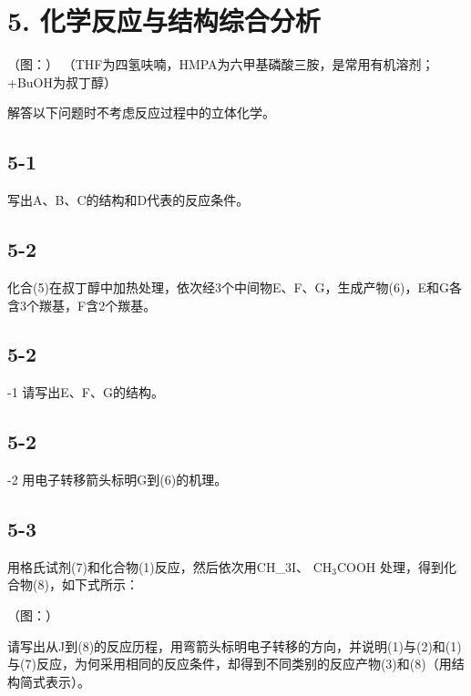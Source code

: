 \section*{5. 化学反应与结构综合分析}
（图：）
（THF为四氢呋喃，HMPA为六甲基磷酸三胺，是常⽤有机溶剂；+BuOH为叔丁醇）

解答以下问题时不考虑反应过程中的⽴体化学。

\subsection*{5-1}
写出A、B、C的结构和D代表的反应条件。

\subsection*{5-2}
化合(5)在叔丁醇中加热处理，依次经3个中间物E、F、G，⽣成产物(6)，E和G各含3个羰基，F含2个羰基。

\subsection*{5-2}
-1 请写出E、F、G的结构。

\subsection*{5-2}
-2 ⽤电⼦转移箭头标明G到(6)的机理。

\subsection*{5-3}
⽤格⽒试剂(7)和化合物(1)反应，然后依次⽤CH_{3}I、 $\mathrm { C H _ { 3 } C O O H }$ 处理，得到化合物(8)，如下式所⽰：

（图：）

请写出从J到(8)的反应历程，⽤弯箭头标明电⼦转移的⽅向，并说明(1)与(2)和(1)与(7)反应，为何采⽤相同的反应条件，却得到不同类别的反应产物(3)和(8)（⽤结构简式表⽰）。
